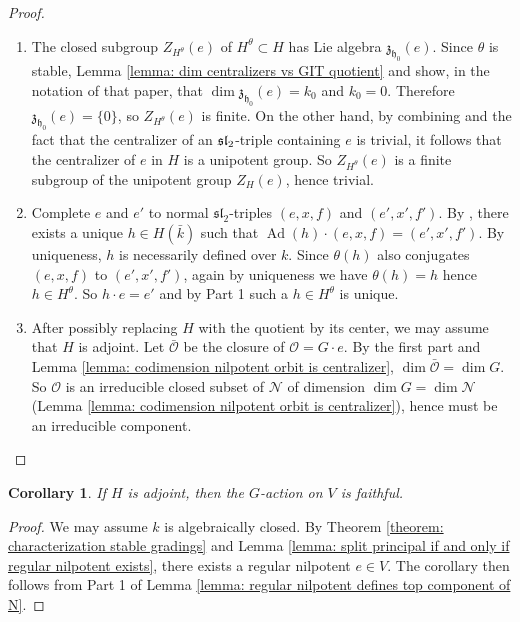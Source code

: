 \documentclass{article} %
\newtheorem{corollary}[proposition]{Corollary}
\numberwithin{equation}{section}
\theoremstyle{definition}
\DeclareMathOperator{\Ad}{Ad}
\newcommand{\frakh}{\mathfrak h}
\newcommand{\frakz}{\mathfrak z}
\newcommand{\fraksl}{\mathfrak{sl}}
\begin{document}
\begin{proof} 
\begin{enumerate}
\item The closed subgroup $Z_{H^{\theta}}(e)$ of $H^{\theta}\subset H$ has Lie algebra $\frakz_{\frakh_0}(e)$.
Since $\theta$ is stable, Lemma \ref{lemma: dim centralizers vs GIT quotient} and \cite[Section 3, Theorem 3.3]{Panyushev-Invarianttheorythetagroups} show, in the notation of that paper, that $\dim \frakz_{\frakh_0}(e)= k_0$ and $k_0=0$.
Therefore $\frakz_{\frakh_0}(e) = \{0\}$, so $Z_{H^{\theta}}(e)$ is finite. On the other hand, by combining \cite[Lemma 3.7.3]{CollingwoodMcGovern-nilpotentorbits} and the fact that the centralizer of an $\frak{sl}_2$-triple containing $e$ is trivial, it follows that the centralizer of $e$ in $H$ is a unipotent group.
So $Z_{H^{\theta}}(e)$ is a finite subgroup of the unipotent group $Z_H(e)$, hence trivial. 

\item Complete $e$ and $e'$ to normal $\fraksl_2$-triples $(e,x,f)$ and $(e',x',f')$.
By \cite[Section 5, Corollaries 5.2 and 5.5]{Kostant-principalthreedimensional}, there exists a unique $h\in H(\bar{k})$ such that $\Ad(h)\cdot (e,x,f) = (e',x',f')$. 
By uniqueness, $h$ is necessarily defined over $k$.
Since $\theta(h)$ also conjugates $(e,x,f)$ to $(e',x',f')$, again by uniqueness we have $\theta(h)=h$ hence $h \in H^{\theta}$.
So $h\cdot e = e'$ and by Part 1 such a $h\in H^{\theta}$ is unique.

\item After possibly replacing $H$ with the quotient by its center, we may assume that $H$ is adjoint.
Let $\bar{\mathcal{O}}$ be the closure of $\mathcal{O} = G\cdot e$. By the first part and Lemma \ref{lemma: codimension nilpotent orbit is centralizer}, $\dim \bar{\mathcal{O}} = \dim G$.
So $\mathcal{O}$ is an irreducible closed subset of $\mathcal{N}$ of dimension $\dim G = \dim \mathcal{N}$ (Lemma \ref{lemma: codimension nilpotent orbit is centralizer}), hence must be an irreducible component.
\end{enumerate}
\end{proof}

\begin{corollary}\label{corollary:Gaction_faithful}
    If $H$ is adjoint, then the $G$-action on $V$ is faithful.
\end{corollary}
\begin{proof}
    We may assume $k$ is algebraically closed.
    By Theorem \ref{theorem: characterization stable gradings} and Lemma \ref{lemma: split principal if and only if regular nilpotent exists}, there exists a regular nilpotent $e\in V$.
    The corollary then follows from Part 1 of Lemma \ref{lemma: regular nilpotent defines top component of N}.
\end{proof}
\end{document}
